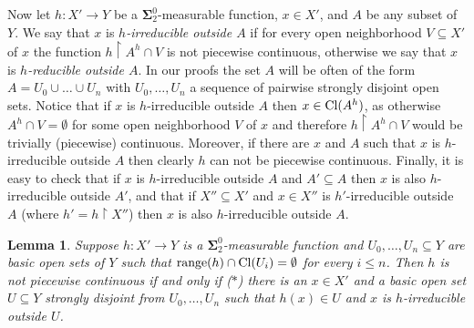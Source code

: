 \documentclass{rae}
\def\Cl{{\rm Cl}}
\newcommand{\bSigma}{\mathbf{\Sigma}}
\newcommand{\restr}[2]{#1 \restriction #2}
\newtheorem{lemma}[theorem]{Lemma}
\theoremstyle{definition}
\begin{document}
Now let $h \colon X' \to Y$ be a $\bSigma^0_2$-measurable function, $x \in 
X'$, and $A$ be any subset of $Y$. We say that $x$ is \emph{$h$-irreducible outside $A$} 
if for every open neighborhood $V \subseteq X'$ of $x$ the function 
$\restr{h}{A^h \cap V}$ is not piecewise continuous, otherwise we 
say that $x$ is \emph{$h$-reducible outside $A$}. In our proofs the set $A$ will be often of the form $A = U_0 \cup \dotsc \cup U_n$ with $U_0, \dotsc, U_n$ a sequence of pairwise strongly disjoint open sets. Notice that if $x$ is $h$-irreducible outside $A$ then $x \in \Cl(A^h)$, as otherwise $A^h \cap V = \emptyset$ for some open neighborhood $V$ of $x$ and therefore $\restr{h}{A^h \cap V}$ would be trivially (piecewise) continuous. Moreover, if there are $x$ and $A$ such that $x$ is $h$-irreducible outside $A$ then clearly $h$ can not be piecewise continuous. Finally, it is easy to check that if $x$ is $h$-irreducible outside $A$ and $A' \subseteq A$ 
then $x$ is also $h$-irreducible outside $A'$, and that if $X'' 
\subseteq X'$ and  $x \in X''$ is $h'$-irreducible outside $A$ (where $h'=\restr{h}{X''}$) 
then $x$ is also $h$-irreducible outside $A$.


\begin{lemma}\label{lemmacrucial}
Suppose $h\colon X' \to Y$ is a $\bSigma^0_2$-measurable function and 
$U_0, \dotsc, U_n \subseteq Y$ are basic open sets of $Y$ such that 
${\rm range}(h) \cap \Cl(U_i) = \emptyset$ for every $i \leq n$.
Then $h$ is \emph{not} piecewise continuous if and only if {\rm ($*$)} 
there is an $x \in X'$ and a basic open set $U \subseteq Y$ strongly 
disjoint from $U_0, \dotsc, U_n$ such that $h(x) \in U$ and $x$ is $h$-irreducible outside
$U$.
\end{lemma}
\end{document}
